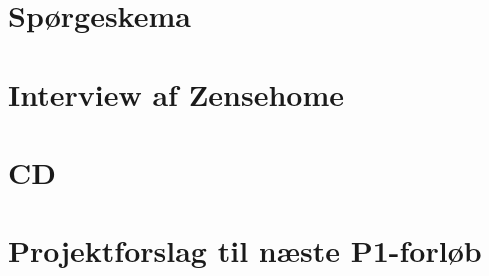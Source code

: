 \appendix
\chapter{Spørgeskema}

\chapter{Interview af Zensehome}

\chapter{CD}

\chapter{Projektforslag til næste P1-forløb}
